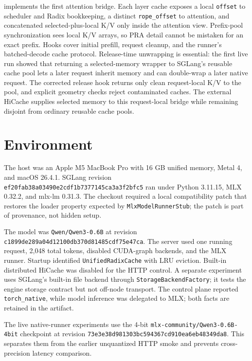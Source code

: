\documentclass[10pt]{article}
\begin{document}
 implements the first attention bridge.
Each layer cache exposes a local \texttt{offset} to scheduler and Radix
bookkeeping, a distinct \texttt{rope\_offset} to attention, and concatenated
selected-plus-local K/V only inside the attention view. Prefix-pool
synchronization sees local K/V arrays, so PRA detail cannot be mistaken for an
exact prefix. Hooks cover initial prefill, request cleanup, and the runner's
batched-decode cache protocol. Release-time unwrapping is essential: the first
live run showed that returning a selected-memory wrapper to SGLang's reusable
cache pool lets a later request inherit memory and can double-wrap a later
native request. The corrected release hook returns only clean request-local K/V
to the pool, and explicit geometry checks reject contaminated caches. The
external HiCache supplies selected memory to this request-local bridge while
remaining disjoint from ordinary reusable cache pools.

\section{Environment}
The host was an Apple M5 MacBook Pro with 16 GB unified memory, Metal 4, and
macOS 26.4.1. SGLang revision
\texttt{ef20fab38a03490e2cdf1b7377145ca3a3f2bfc5} ran under Python 3.11.15,
MLX 0.32.2, and mlx-lm 0.31.3. The checkout required a local compatibility
patch that restores the loader property expected by
\texttt{MlxModelRunnerStub}; the patch is part of provenance, not hidden setup.

The model was \texttt{Qwen/Qwen3-0.6B} at revision
\texttt{c1899de289a04d12100db370d81485cdf75e47ca}. The server used one running
request, 2,048 total tokens, disabled CUDA-graph backends, and the MLX runner.
Startup identified \texttt{UnifiedRadixCache} with LRU eviction. Built-in
distributed HiCache was disabled for the HTTP control. A separate experiment
uses SGLang's built-in file backend through \texttt{StorageBackendFactory}; it
tests the engine storage contract but not off-node transport. The control plane reported
\texttt{torch\_native}, while model
inference was delegated to MLX; both facts are retained in the artifact.

The live native-runner experiments use the 4-bit
\texttt{mlx-community/Qwen3-0.6B-4bit} checkpoint at revision
\texttt{73e3e38d981303bc594367cd910ea6eb48349da8}. This separates them from
the earlier unquantized HTTP smoke and prevents cross-precision latency
comparison.
\end{document}

